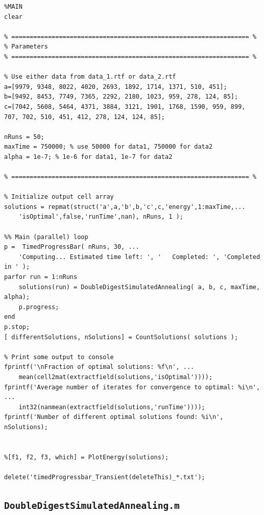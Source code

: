 \documentclass[12pt,A4,titlepage]{article}
\begin{document}
\begin{lstlisting}
%MAIN
clear

% ================================================================= %
% Parameters
% ================================================================= %

% Use either data from data_1.rtf or data_2.rtf
a=[9979, 9348, 8022, 4020, 2693, 1892, 1714, 1371, 510, 451];
b=[9492, 8453, 7749, 7365, 2292, 2180, 1023, 959, 278, 124, 85];
c=[7042, 5608, 5464, 4371, 3884, 3121, 1901, 1768, 1590, 959, 899, 707, 702, 510, 451, 412, 278, 124, 124, 85];

nRuns = 50;
maxTime = 750000; % use 50000 for data1, 750000 for data2
alpha = 1e-7; % 1e-6 for data1, 1e-7 for data2

% ================================================================= %

% Initialize output cell array
solutions = repmat(struct('a',a,'b',b,'c',c,'energy',1:maxTime,...
    'isOptimal',false,'runTime',nan), nRuns, 1 );

%% Main (parallel) loop
p =  TimedProgressBar( nRuns, 30, ...
    'Computing... Estimated time left: ', '   Completed: ', 'Completed in ' );
parfor run = 1:nRuns
    solutions(run) = DoubleDigestSimulatedAnnealing( a, b, c, maxTime, alpha);
    p.progress;
end
p.stop;
[ differentSolutions, nSolutions] = CountSolutions( solutions );

% Print some output to console
fprintf('\nFraction of optimal solutions: %f\n', ...
    mean(cell2mat(extractfield(solutions,'isOptimal'))));
fprintf('Average number of iterates for convergence to optimal: %i\n', ...
    int32(nanmean(extractfield(solutions,'runTime'))));
fprintf('Number of different optimal solutions found: %i\n', nSolutions);


%[f1, f2, f3, which] = PlotEnergy(solutions);

delete('timedProgressbar_Transient(deleteThis)_*.txt');
\end{lstlisting}

\subsection*{\texttt{DoubleDigestSimulatedAnnealing.m}}
\end{document}
